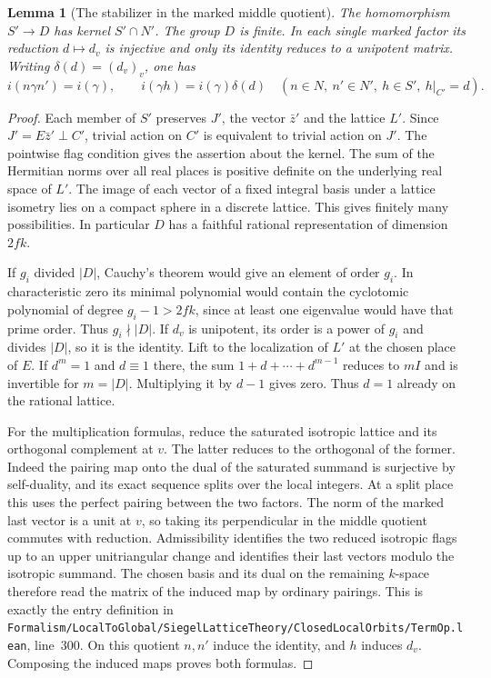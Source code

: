 \documentclass[a4paper,11pt]{article}
\newtheorem{lemma}[proposition]{Lemma}
\theoremstyle{definition}
\theoremstyle{remark}
\newcommand{\srcloc}[2]{{\small\nolinkurl{#1.lean}}, line~#2}
\numberwithin{equation}{section}
\begin{document}
\begin{lemma}[The stabilizer in the marked middle quotient]
\leavevmode\label{lem:middlelattice531}
The homomorphism \(S'\to D\) has kernel \(S'\cap N'\).
The group \(D\) is finite. In each single marked factor its
reduction \(d\mapsto d_v\) is injective and only its identity
reduces to a unipotent matrix. Writing
\(\delta(d)=(d_v)_v\), one has
\[
       i(n\gamma n')=i(\gamma),\qquad
       i(\gamma h)=i(\gamma)\delta(d)
       \quad(n\in N,\ n'\in N',\ h\in S',\ h|_{C'}=d).
\]
\end{lemma}
\begin{proof}
Each member of \(S'\) preserves \(J'\), the vector \(\bar z'\)
and the lattice \(L'\). Since \(J'=E\bar z'\perp C'\), trivial
action on \(C'\) is equivalent to trivial action on \(J'\).
The pointwise flag condition gives the assertion about the kernel.
The sum of the Hermitian norms over all real places is positive
definite on the underlying real space of \(L'\). The image of
each vector of a fixed integral basis under a lattice isometry
lies on a compact sphere in a discrete lattice. This gives
finitely many possibilities. In particular \(D\) has a faithful
rational representation of dimension \(2fk\).

If \(g_i\) divided \(|D|\), Cauchy's theorem would give an
element of order \(g_i\). In characteristic zero its minimal
polynomial would contain the cyclotomic polynomial of degree
\(g_i-1>2fk\), since at least one eigenvalue would have that
prime order. Thus \(g_i\nmid |D|\). If \(d_v\) is unipotent,
its order is a power of \(g_i\) and divides \(|D|\), so it is
the identity. Lift to the localization of \(L'\) at the chosen
place of \(E\). If \(d^m=1\) and \(d\equiv1\) there, the sum
\(1+d+\cdots+d^{m-1}\) reduces to \(mI\) and is invertible
for \(m=|D|\). Multiplying it by \(d-1\) gives zero. Thus
\(d=1\) already on the rational lattice.

For the multiplication formulas, reduce the saturated isotropic
lattice and its orthogonal complement at \(v\). The latter reduces
to the orthogonal of the former. Indeed the pairing map onto the
dual of the saturated summand is surjective by self-duality, and
its exact sequence splits over the local integers. At a split
place this uses the perfect pairing between the two factors.
The norm of the marked last vector is a unit at \(v\), so taking
its perpendicular in the middle quotient commutes with reduction.
Admissibility identifies the two reduced isotropic flags up to an
upper unitriangular change and identifies their last vectors
modulo the isotropic summand. The chosen basis and its dual on
the remaining \(k\)-space therefore read the matrix of the
induced map by ordinary pairings. This is exactly the entry
definition in
\srcloc{Formalism/LocalToGlobal/SiegelLatticeTheory/ClosedLocalOrbits/TermOp}{300}.
On this quotient \(n,n'\) induce the identity, and \(h\) induces
\(d_v\). Composing the induced maps proves both formulas.
\end{proof}
\end{document}
